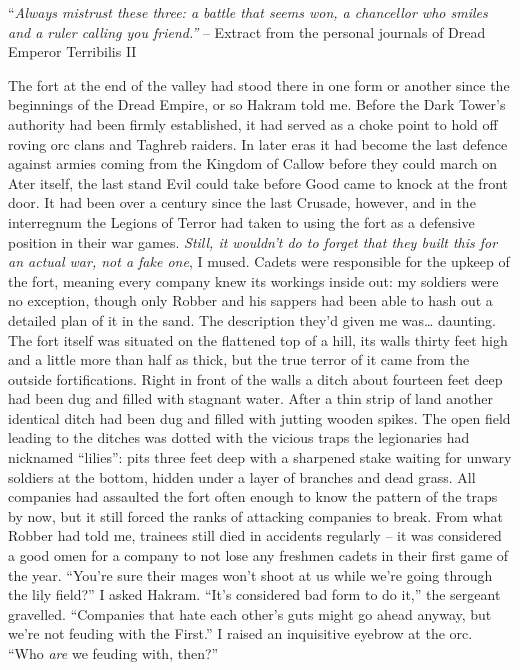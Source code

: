 \documentclass[12pt, openany]{book}
\begin{document}
“\textit{Always mistrust these three: a battle that seems won, a chancellor who smiles and a ruler calling you friend.”}
– Extract from the personal journals of Dread Emperor Terribilis II

The fort at the end of the valley had stood there in one form or another since the beginnings of the Dread Empire, or so Hakram told me. Before the Dark Tower’s authority had been firmly established, it had served as a choke point to hold off roving orc clans and Taghreb raiders. In later eras it had become the last defence against armies coming from the Kingdom of Callow before they could march on Ater itself, the last stand Evil could take before Good came to knock at the front door. It had been over a century since the last Crusade, however, and in the interregnum the Legions of Terror had taken to using the fort as a defensive position in their war games.
\textit{Still, it wouldn’t do to forget that they built this for an actual war, not a fake one}, I mused. Cadets were responsible for the upkeep of the fort, meaning every company knew its workings inside out: my soldiers were no exception, though only Robber and his sappers had been able to hash out a detailed plan of it in the sand. The description they’d given me was… daunting.
The fort itself was situated on the flattened top of a hill, its walls thirty feet high and a little more than half as thick, but the true terror of it came from the outside fortifications. Right in front of the walls a ditch about fourteen feet deep had been dug and filled with stagnant water. After a thin strip of land another identical ditch had been dug and filled with jutting wooden spikes. The open field leading to the ditches was dotted with the vicious traps the legionaries had nicknamed “lilies”: pits three feet deep with a sharpened stake waiting for unwary soldiers at the bottom, hidden under a layer of branches and dead grass.
All companies had assaulted the fort often enough to know the pattern of the traps by now, but it still forced the ranks of attacking companies to break. From what Robber had told me, trainees still died in accidents regularly – it was considered a good omen for a company to not lose any freshmen cadets in their first game of the year.
“You’re sure their mages won’t shoot at us while we’re going through the lily field?” I asked Hakram.
“It’s considered bad form to do it,” the sergeant gravelled. “Companies that hate each other’s guts might go ahead anyway, but we’re not feuding with the First.”
I raised an inquisitive eyebrow at the orc.
“Who \textit{are }we feuding with, then?”
\end{document}
